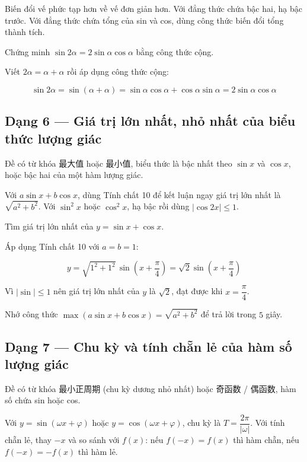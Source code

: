 \documentclass[11pt, a4paper]{article}
\begin{document}
 Biến đổi vế phức tạp hơn về vế đơn giản hơn. Với đẳng thức chứa bậc hai, hạ bậc trước. Với đẳng thức chứa tổng của sin và cos, dùng công thức biến đổi tổng thành tích.

\begin{vidu}[{5}]
Chứng minh $\sin 2\alpha = 2\sin\alpha\cos\alpha$ bằng công thức cộng.

Viết $2\alpha = \alpha + \alpha$ rồi áp dụng công thức cộng:

$$\sin 2\alpha = \sin(\alpha + \alpha) = \sin\alpha\cos\alpha + \cos\alpha\sin\alpha = 2\sin\alpha\cos\alpha$$

\end{vidu}
\subsection{Dạng 6 — Giá trị lớn nhất, nhỏ nhất của biểu thức lượng giác}

 Đề có từ khóa 最大值 hoặc 最小值, biểu thức là bậc nhất theo $\sin x$ và $\cos x$, hoặc bậc hai của một hàm lượng giác.

 Với $a\sin x + b\cos x$, dùng Tính chất 10 để kết luận ngay giá trị lớn nhất là $\sqrt{a^2+b^2}$. Với $\sin^2 x$ hoặc $\cos^2 x$, hạ bậc rồi dùng $|\cos 2x| \le 1$.

\begin{vidu}[{6}]
Tìm giá trị lớn nhất của $y = \sin x + \cos x$.

Áp dụng Tính chất 10 với $a = b = 1$:

$$y = \sqrt{1^2 + 1^2}\,\sin\!\left(x + \frac{\pi}{4}\right) = \sqrt{2}\sin\!\left(x + \frac{\pi}{4}\right)$$

Vì $|\sin| \le 1$ nên giá trị lớn nhất của $y$ là $\sqrt{2}$, đạt được khi $x = \dfrac{\pi}{4}$.

 Nhớ công thức $\max(a\sin x + b\cos x) = \sqrt{a^2+b^2}$ để trả lời trong $5$ giây.

\end{vidu}
\subsection{Dạng 7 — Chu kỳ và tính chẵn lẻ của hàm số lượng giác}

 Đề có từ khóa 最小正周期 (chu kỳ dương nhỏ nhất) hoặc 奇函数 / 偶函数, hàm số chứa sin hoặc cos.

 Với $y = \sin(\omega x + \varphi)$ hoặc $y = \cos(\omega x + \varphi)$, chu kỳ là $T = \dfrac{2\pi}{|\omega|}$. Với tính chẵn lẻ, thay $-x$ và so sánh với $f(x)$: nếu $f(-x) = f(x)$ thì hàm chẵn, nếu $f(-x) = -f(x)$ thì hàm lẻ.
\end{document}
